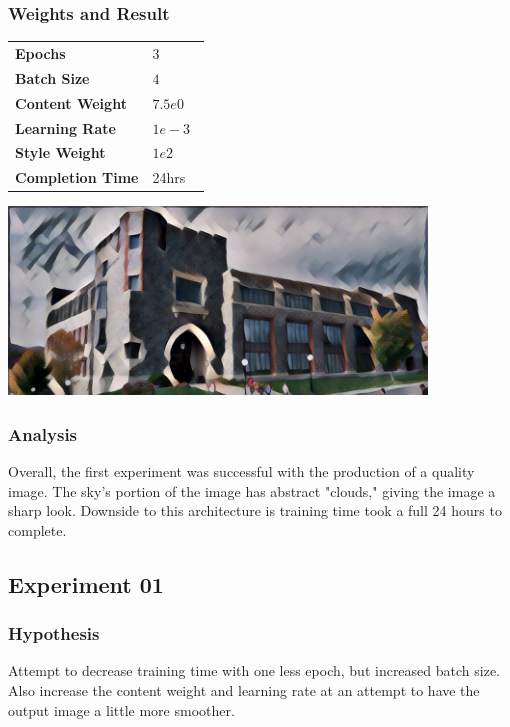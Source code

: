 \documentclass[12pt]{article}
\begin{document}
\subsubsection{Weights and Result}
\begin{minipage}[t]{0.4\textwidth}
\begin{tabular}{l l}
    \textbf{Epochs} &$3$     \\
    \textbf{Batch Size}     & $4$     \\
    \textbf{Content Weight} & $7.5e0$ \\
    \textbf{Learning Rate}  & $1e-3$  \\
    \textbf{Style Weight}   & $1e2$ \\
    \textbf{Completion Time}  & 24hrs  \
\vspace{3.5cm}\\
\end{tabular}
\end{minipage}
\begin{minipage}{0.1\textwidth}
\end{minipage}
\begin{minipage}[t]{0.6\textwidth}
\includegraphics[height=50mm]{visuals/results/00.png}
\end{minipage} \vspace{-3cm}
\subsubsection{Analysis}
Overall, the first experiment was successful with the production of a quality image. The sky's portion of the image has abstract "clouds," giving the image a sharp look. Downside to this architecture is training time took a full 24 hours to complete.


\subsection{Experiment 01}
\subsubsection{Hypothesis} Attempt to decrease training time with one less epoch, but increased batch size. Also increase the content weight and learning rate at an attempt to have the output image a little more smoother.
\end{document}
